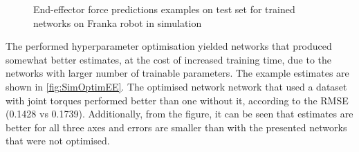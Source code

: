 \begin{figure}
{    }
    \vfill
    \hfill
    \caption{End-effector force predictions examples on test set for trained networks on Franka robot in simulation}
    \label{fig:SimGraphs}
\end{figure}

The performed hyperparameter optimisation yielded networks that produced somewhat better estimates, at the cost of increased training time, due to the networks with larger number of trainable parameters. The example estimates are shown in \cref{fig:SimOptimEE}. The optimised network network that used a dataset with joint torques performed better than one without it, according to the RMSE (0.1428 vs 0.1739). Additionally, from the figure, it can be seen that estimates are better for all three axes and errors are smaller than with the presented networks that were not optimised.

